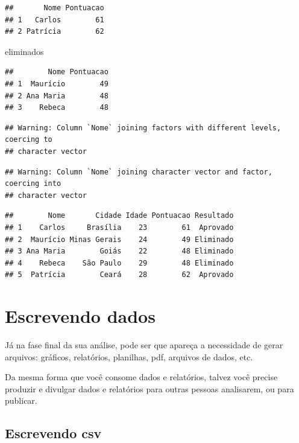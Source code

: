 \documentclass[]{book}
\newenvironment{Shaded}{\begin{snugshade}}{\end{snugshade}}
\newcommand{\NormalTok}[1]{#1}
\begin{document}
\begin{verbatim}
##       Nome Pontuacao
## 1   Carlos        61
## 2 Patrícia        62
\end{verbatim}

\begin{Shaded}
\begin{Highlighting}[]
\NormalTok{eliminados}
\end{Highlighting}
\end{Shaded}

\begin{verbatim}
##        Nome Pontuacao
## 1  Maurício        49
## 2 Ana Maria        48
## 3    Rebeca        48
\end{verbatim}

\begin{verbatim}
## Warning: Column `Nome` joining factors with different levels, coercing to
## character vector
\end{verbatim}

\begin{verbatim}
## Warning: Column `Nome` joining character vector and factor, coercing into
## character vector
\end{verbatim}

\begin{verbatim}
##        Nome       Cidade Idade Pontuacao Resultado
## 1    Carlos     Brasília    23        61  Aprovado
## 2  Maurício Minas Gerais    24        49 Eliminado
## 3 Ana Maria        Goiás    22        48 Eliminado
## 4    Rebeca    São Paulo    29        48 Eliminado
## 5  Patrícia        Ceará    28        62  Aprovado
\end{verbatim}

\chapter{Escrevendo dados}\label{escrevendo-dados}

Já na fase final da sua análise, pode ser que apareça a necessidade de
gerar arquivos: gráficos, relatórios, planilhas, pdf, arquivos de dados,
etc.

Da mesma forma que você consome dados e relatórios, talvez você precise
produzir e divulgar dados e relatórios para outras pessoas analisarem,
ou para publicar.

\section{Escrevendo csv}\label{escrevendo-csv}
\end{document}
